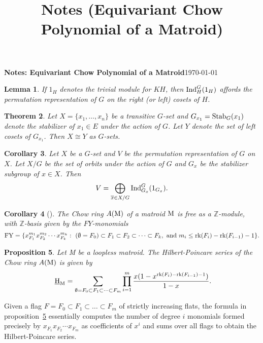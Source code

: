 \documentclass[11pt]{article}
\title{Notes (Equivariant Chow Polynomial of a Matroid)}
\newcommand{\bz}{\mathbb{Z}}
\newcommand{\ind}{\text{\normalfont Ind}}
\newcommand{\stab}{\text{\normalfont Stab}}
\newcommand{\hilbM}{\normalfont\text{ \underline{H}}_\text{M}}
\newcommand{\rank}{\normalfont\text{rk}}
\newcommand{\matM}{\normalfont\text{M}}
\newtheorem{theorem}{Theorem}
\newtheorem{corollary}[theorem]{Corollary}
\newtheorem{lemma}[theorem]{Lemma}
\newtheorem{proposition}[theorem]{Proposition}
\theoremstyle{remark}
\begin{document}
{\textbf{Notes: Equivariant Chow Polynomial of a Matroid}}\hfill {\small{\today}}

\hrulefill
\begin{lemma}
    If $1_H$ denotes the trivial module for $KH$, then $\ind_H^G(1_H)$ affords the permutation representation
    of $G$ on the right (or left) cosets of $H$.
\end{lemma}

\begin{theorem}
    Let $X = \{x_1,\ldots, x_n\}$ be a transitive $G$-set and $G_{x_1} = \stab_G(x_1)$ denote the
    stabilizer of $x_1\in E$ under the action of $G$. Let $Y$ denote the set of left cosets of $G_{x_1}$.
    Then $X\cong Y$ as $G$-sets.
\end{theorem}

\begin{corollary}
    Let $X$ be a $G$-set and $V$ be the permutation representation of $G$ on $X$. Let $X/G$ be the set of orbits
    under the action of $G$ and $G_x$ be the stabilizer subgroup of $x\in X$. Then
    $$V = \bigoplus_{\overline{x}\in X/G}{\ind_{G_x}^G(1_{G_x})}.$$
\end{corollary}

\hrulefill

\begin{corollary}
    [\cite{fy-2004}\cite{angarone2024chowringsmatroidspermutation}]
    The Chow ring $A(\matM)$ of a matroid $\matM$
    is free as a $\bz$-module, with $\bz$-basis given by the $FY$-monomials
        $$\text{FY}=\{x_{F_1}^{m_1}x_{F_2}^{m_2}\cdots x_{F_k}^{m_k}:\ (\emptyset = F_0)\subset
        F_1\subset F_2\subset\cdots\subset
        F_k,\ \text{and}\ m_i\leq\rank(F_i)-\rank(F_{i-1})-1 \}.$$
\end{corollary}


\begin{proposition}
    \label{prop:fy-formula}
    Let M be a loopless matroid. The Hilbert-Poincare series of the Chow ring $A(\matM)$ is given by
    $$\hilbM = \sum_{\emptyset = F_0\subset F_1\subset \cdots\subset F_m}{\prod_{i=1}^m{
        \frac{x(1-x^{\rank(F_i)-\rank(F_{i-1})-1})}{1-x}}}.$$
\end{proposition}

\hspace*{5mm}
Given a flag $F = F_0\subset F_1\subset\ldots\subset F_m$ of strictly increasing flats, the formula in
proposition~\ref{prop:fy-formula} essentially computes the number of degree $i$ monomials formed
precisely by $x_{F_1}x_{F_2}\cdots x_{F_m}$ as coefficients of $x^i$ and sums over all flags to obtain the
Hilbert-Poincare series.
\end{document}
